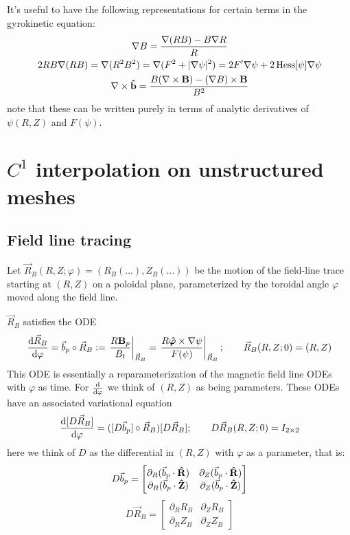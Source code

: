 \documentclass[]{article}
\begin{document}
It's useful to have the following representations for certain terms in the gyrokinetic equation:
\begin{gather*}
	\nabla B = \frac{\nabla(RB) - B \nabla R}{R} \\
	2 RB \nabla(RB) = \nabla(R^2B^2) = \nabla(F^2 + |\nabla\psi|^2) = 2 F' \nabla \psi + 2 \operatorname{Hess}[\psi] \nabla \psi \\
	\nabla \times \vu{b} = \frac{B (\nabla \times \vb{B}) - (\nabla B) \times \vb{B}}{B^2}
\end{gather*}
note that these can be written purely in terms of analytic derivatives of \(\psi(R,Z)\) and \(F(\psi)\).

\section{\(C^1\) interpolation on unstructured meshes}

\subsection{Field line tracing}
Let \(\vec{R}_B(R,Z;\varphi) = (R_B(...), Z_B(...))\) be the motion of the field-line trace starting at \((R,Z)\) on a poloidal plane, parameterized by the toroidal angle \(\varphi\) moved along the field line.

\(\vec{R}_B\) satisfies the ODE
\begin{equation*}
	\dv{\vec{R}_B}{\varphi} = \vec{b}_p \circ \vec{R}_B := \eval{\frac{R\vb{B}_p}{B_t}}_{\vec{R}_B} = \eval{\frac{R \vu*{\varphi} \times \nabla \psi}{F(\psi)}}_{\vec{R}_B}; \qquad
	\vec{R}_B(R,Z;0) = (R,Z)
\end{equation*}
This ODE is essentially a reparameterization of the magnetic field line ODEs with \(\varphi\) as time.
For \(\dv{\varphi}\) we think of \((R,Z)\) as being parameters.
These ODEs have an associated variational equation
\begin{equation*}
	\dv{[D\vec{R}_B]}{\varphi} = ([D\vec{b}_p] \circ \vec{R}_B) [D\vec{R}_B]; \qquad D\vec{R}_B(R,Z;0) = I_{2\times2}
\end{equation*}
here we think of \(D\) as the differential in \((R,Z)\) with \(\varphi\) as a parameter, that is:
\begin{equation*}
	D\vec{b}_p = \begin{bmatrix}
		\partial_R(\vec{b}_p \cdot \vu{R}) & \partial_Z(\vec{b}_p \cdot \vu{R}) \\
		\partial_R(\vec{b}_p \cdot \vu{Z}) & \partial_Z(\vec{b}_p \cdot \vu{Z})
	\end{bmatrix}
\end{equation*}
\begin{equation*}
	D\vec{R}_B = \begin{bmatrix}
		\partial_R R_B & \partial_Z R_B \\
		\partial_R Z_B & \partial_Z Z_B
	\end{bmatrix}
\end{equation*}
\end{document}

